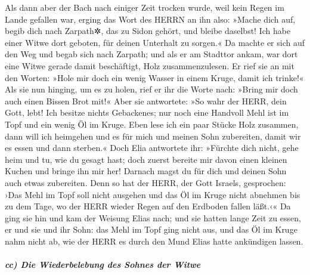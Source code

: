 Als dann aber der Bach nach einiger Zeit trocken wurde,
weil kein Regen im Lande gefallen war, erging das Wort des
HERRN an ihn also: »Mache dich auf, begib dich nach
Zarpath✲, das zu Sidon gehört, und bleibe daselbst! Ich habe einer Witwe
dort geboten, für deinen Unterhalt zu sorgen.« Da machte
er sich auf den Weg und begab sich nach Zarpath; und als er am Stadttor
ankam, war dort eine Witwe gerade damit beschäftigt, Holz
zusammenzulesen. Er rief sie an mit den Worten: »Hole mir doch ein wenig
Wasser in einem Kruge, damit ich trinke!« Als sie nun
hinging, um es zu holen, rief er ihr die Worte nach: »Bring mir doch
auch einen Bissen Brot mit!« Aber sie antwortete: »So
wahr der HERR, dein Gott, lebt! Ich besitze nichts Gebackenes; nur noch
eine Handvoll Mehl ist im Topf und ein wenig Öl im Kruge. Eben lese ich
ein paar Stücke Holz zusammen, dann will ich heimgehen und es für mich
und meinen Sohn zubereiten, damit wir es essen und dann sterben.«
Doch Elia antwortete ihr: »Fürchte dich nicht, gehe heim
und tu, wie du gesagt hast; doch zuerst bereite mir davon einen kleinen
Kuchen und bringe ihn mir her! Darnach magst du für dich und deinen Sohn
auch etwas zubereiten. Denn so hat der HERR, der Gott
Israels, gesprochen: ›Das Mehl im Topf soll nicht ausgehen und das Öl im
Kruge nicht abnehmen bis zu dem Tage, wo der HERR wieder Regen auf den
Erdboden fallen läßt.‹« Da ging sie hin und kam der
Weisung Elias nach; und sie hatten lange Zeit zu essen, er und sie und
ihr Sohn: das Mehl im Topf ging nicht aus, und das Öl im
Kruge nahm nicht ab, wie der HERR es durch den Mund Elias hatte
ankündigen lassen.

\hypertarget{cc-die-wiederbelebung-des-sohnes-der-witwe}{%
\subparagraph{cc) Die Wiederbelebung des Sohnes der
Witwe}\label{cc-die-wiederbelebung-des-sohnes-der-witwe}}

